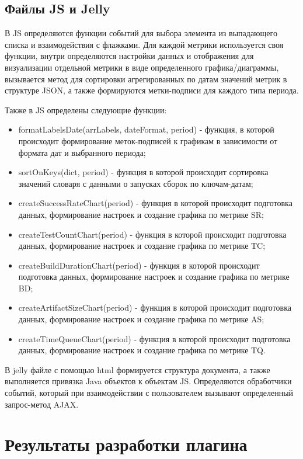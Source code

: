 \subsection{Файлы JS и Jelly}

В JS определяются функции событий для выбора элемента из выпадающего списка и взаимодействия с флажками. Для каждой метрики используется своя функции, внутри определяются настройки данных и отображения для визуализации отдельной метрики в виде определенного графика/диаграммы, вызывается метод для сортировки агрегированных по датам значений метрик в структуре JSON, а также формируются метки-подписи для каждого типа периода.

Также в JS определены следующие функции:

\begin{itemize}
	\item formatLabelsDate(arrLabels, dateFormat, period) - функция, в которой происходит формирование меток-подписей к графикам в зависимости от формата дат и выбранного периода;
	\item sortOnKeys(dict, period) - функция в которой происходит сортировка значений словаря с данными о запусках сборок по ключам-датам;
	\item createSuccessRateChart(period) - функция в которой происходит подготовка данных, формирование настроек и создание графика по метрике SR;
	\item createTestCountChart(period) - функция в которой происходит подготовка данных, формирование настроек и создание графика по метрике TC;
	\item createBuildDurationChart(period) - функция в которой происходит подготовка данных, формирование настроек и создание графика по метрике BD;
	\item createArtifactSizeChart(period) - функция в которой происходит подготовка данных, формирование настроек и создание графика по метрике AS;
	\item createTimeQueueChart(period) - функция в которой происходит подготовка данных, формирование настроек и создание графика по метрике TQ.
\end{itemize}

В jelly файле с помощью html формируется структура документа, а также выполняется привязка Java объектов к объектам JS. Определяются обработчики событий, который при взаимодействии с пользователем вызывают определенный запрос-метод AJAX.

\section{Результаты разработки плагина} \label{ch3:sec2}

